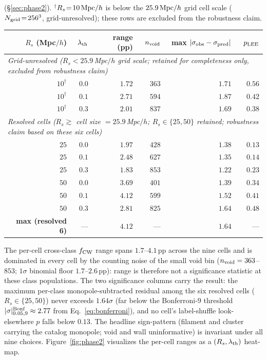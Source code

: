 \documentclass[aps,prd,twocolumn,superscriptaddress,showpacs,preprintnumbers,nofootinbib,longbibliography,floatfix]{revtex4-2}
\begin{document}
\begin{table}[t]
{(\S\ref{sec:phase2}). $^\dagger$$R_s\!=\!10\,{\rm Mpc}/h$ is below the
$25.9\,{\rm Mpc}/h$ grid cell scale ($N_{\rm grid}\!=\!256^3$, grid-unresolved);
these rows are excluded from the robustness claim.}
\label{tab:phase2}
\begin{ruledtabular}
\begin{tabular}{rrrrrr}
$R_s$ (Mpc$/h$) & $\lambda_{\rm th}$ & range (pp) & $n_{\rm void}$ &
max $|\sigma_{\rm obs}-\sigma_{\rm pred}|$ & $p_{\rm LEE}$ \\
\hline
\multicolumn{6}{l}{\textit{Grid-unresolved ($R_s < 25.9$\,Mpc$/h$ grid scale; retained for completeness only, excluded from robustness claim)}} \\
$10^\dagger$ & $0.0$ & $1.72$ & $363$ & $1.71$ & $0.56$ \\
$10^\dagger$ & $0.1$ & $2.71$ & $594$ & $1.87$ & $0.42$ \\
$10^\dagger$ & $0.3$ & $2.01$ & $837$ & $1.69$ & $0.38$ \\
\hline
\multicolumn{6}{l}{\textit{Resolved cells ($R_s \gtrsim$ cell size $= 25.9$\,Mpc$/h$; $R_s \in \{25, 50\}$ retained; robustness claim based on these six cells)}} \\
$25$ & $0.0$ & $1.97$ & $428$ & $1.38$ & $0.13$ \\
$25$ & $0.1$ & $2.48$ & $627$ & $1.35$ & $0.14$ \\
$25$ & $0.3$ & $1.83$ & $853$ & $1.22$ & $0.23$ \\
$50$ & $0.0$ & $3.69$ & $401$ & $1.39$ & $0.34$ \\
$50$ & $0.1$ & $4.12$ & $599$ & $1.52$ & $0.41$ \\
$50$ & $0.3$ & $2.81$ & $825$ & $1.64$ & $0.48$ \\
\hline
\textbf{max (resolved 6)} & --- & $\mathbf{4.12}$ & --- &
$\mathbf{1.64}$ & --- \\
\end{tabular}
\end{ruledtabular}
\end{table}

The per-cell cross-class $f_{\rm CW}$ range spans $1.7$--$4.1$\,pp
across the nine cells and is dominated in every cell by the
counting noise of the small void bin ($n_{\rm void} = 363$--$853$;
$1\sigma$ binomial floor $1.7$--$2.6$\,pp): range is therefore not a
significance statistic at these class populations. The two
significance columns carry the result: the maximum per-class
monopole-subtracted residual among the six resolved cells ($R_s \in
\{25, 50\}$) never exceeds $1.64\sigma$ (far below the
Bonferroni-9 threshold $|\sigma|^{\rm Bonf}_{0.05,9} \approx 2.77$
from Eq.~\eqref{eq:bonferroni}),
and no cell's label-shuffle look-elsewhere $p$ falls below $0.13$.
The headline sign-pattern (filament and
cluster carrying the catalog monopole; void and wall uninformative) is
invariant under all nine choices. Figure~\ref{fig:phase2} visualizes
the per-cell ranges as a $(R_s, \lambda_{\rm th})$ heat-map.
\end{document}
